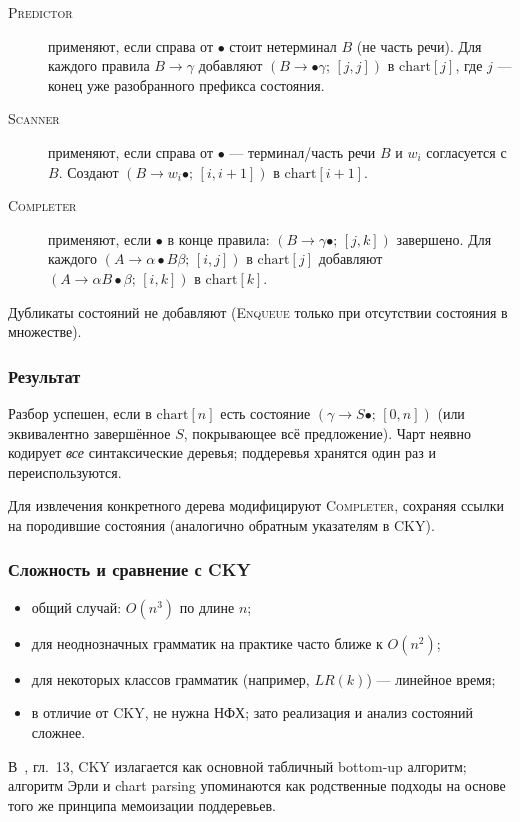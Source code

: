 \begin{description}
	\item[\textsc{Predictor}] применяют, если справа от $\bullet$ стоит нетерминал $B$ (не часть речи).
	Для каждого правила $B \to \gamma$ добавляют $(B \to \bullet \gamma;\,[j,j])$ в $\mathrm{chart}[j]$, где $j$ --- конец уже разобранного префикса состояния.

	\item[\textsc{Scanner}] применяют, если справа от $\bullet$ --- терминал/часть речи $B$ и $w_i$ согласуется с $B$.
	Создают $(B \to w_i \bullet;\,[i,i{+}1])$ в $\mathrm{chart}[i{+}1]$.

	\item[\textsc{Completer}] применяют, если $\bullet$ в конце правила: $(B \to \gamma \bullet;\,[j,k])$ завершено.
	Для каждого $(A \to \alpha \bullet B \beta;\,[i,j])$ в $\mathrm{chart}[j]$ добавляют $(A \to \alpha B \bullet \beta;\,[i,k])$ в $\mathrm{chart}[k]$.
\end{description}

Дубликаты состояний не добавляют (\textsc{Enqueue} только при отсутствии состояния в множестве).

\subsubsection{Результат}

Разбор успешен, если в $\mathrm{chart}[n]$ есть состояние $(\gamma \to S \bullet;\,[0,n])$ (или эквивалентно завершённое $S$, покрывающее всё предложение).
Чарт неявно кодирует \emph{все} синтаксические деревья; поддеревья хранятся один раз и переиспользуются.

Для извлечения конкретного дерева модифицируют \textsc{Completer}, сохраняя ссылки на породившие состояния (аналогично обратным указателям в CKY).

\subsubsection{Сложность и сравнение с CKY}

\begin{itemize}
	\item общий случай: $O(n^3)$ по длине $n$;
	\item для неоднозначных грамматик на практике часто ближе к $O(n^2)$;
	\item для некоторых классов грамматик (например, $LR(k)$) --- линейное время;
	\item в отличие от CKY, не нужна НФХ; зато реализация и анализ состояний сложнее.
\end{itemize}

В~\cite{jurafsky2026speech}, гл.~13, CKY излагается как основной табличный bottom-up алгоритм; алгоритм Эрли и chart parsing упоминаются как родственные подходы на основе того же принципа мемоизации поддеревьев.
